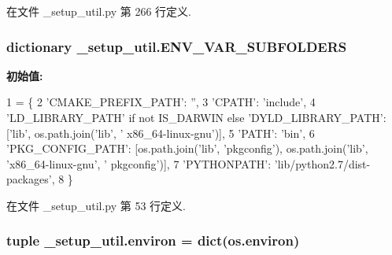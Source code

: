 在文件 \-\_\-setup\-\_\-util.\-py 第 266 行定义.

\hypertarget{namespace__setup__util_aa31804f1be8660156ce9394b33c68dc4}{
\subsubsection[{E\-N\-V\-\_\-\-V\-A\-R\-\_\-\-S\-U\-B\-F\-O\-L\-D\-E\-R\-S}]{\setlength{\rightskip}{0pt plus 5cm}dictionary \-\_\-setup\-\_\-util.\-E\-N\-V\-\_\-\-V\-A\-R\-\_\-\-S\-U\-B\-F\-O\-L\-D\-E\-R\-S}}\label{namespace__setup__util_aa31804f1be8660156ce9394b33c68dc4}
{\bfseries 初始值\-:}
\begin{DoxyCode}
1 = \{
2     \textcolor{stringliteral}{'CMAKE\_PREFIX\_PATH'}: \textcolor{stringliteral}{''},
3     \textcolor{stringliteral}{'CPATH'}: \textcolor{stringliteral}{'include'},
4     \textcolor{stringliteral}{'LD\_LIBRARY\_PATH'} \textcolor{keywordflow}{if} \textcolor{keywordflow}{not} IS\_DARWIN \textcolor{keywordflow}{else} \textcolor{stringliteral}{'DYLD\_LIBRARY\_PATH'}: [\textcolor{stringliteral}{'lib'}, os.path.join(\textcolor{stringliteral}{'lib'}, \textcolor{stringliteral}{'
      x86\_64-linux-gnu'})],
5     \textcolor{stringliteral}{'PATH'}: \textcolor{stringliteral}{'bin'},
6     \textcolor{stringliteral}{'PKG\_CONFIG\_PATH'}: [os.path.join(\textcolor{stringliteral}{'lib'}, \textcolor{stringliteral}{'pkgconfig'}), os.path.join(\textcolor{stringliteral}{'lib'}, \textcolor{stringliteral}{'x86\_64-linux-gnu'}, \textcolor{stringliteral}{'
      pkgconfig'})],
7     \textcolor{stringliteral}{'PYTHONPATH'}: \textcolor{stringliteral}{'lib/python2.7/dist-packages'},
8 \}
\end{DoxyCode}


在文件 \-\_\-setup\-\_\-util.\-py 第 53 行定义.

\hypertarget{namespace__setup__util_a0a3189a3fa13a696964c791ed2a5ea85}{
\subsubsection[{environ}]{\setlength{\rightskip}{0pt plus 5cm}tuple \-\_\-setup\-\_\-util.\-environ = dict(os.\-environ)}}\label{namespace__setup__util_a0a3189a3fa13a696964c791ed2a5ea85}


